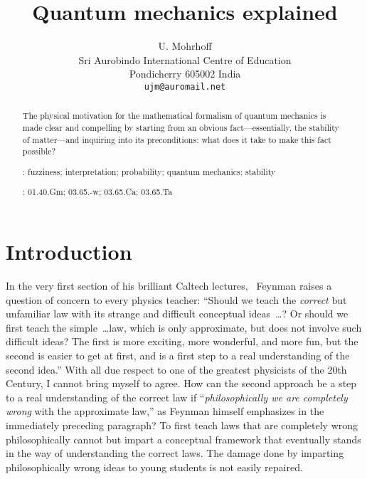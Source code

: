 \documentclass[12pt]{article}
\begin{document}
\setlength{\baselineskip}{16.5pt}
\title{Quantum mechanics explained}
\author{U. Mohrhoff\\
Sri Aurobindo International Centre of Education\\
Pondicherry 605002 India\\
\normalsize\tt ujm@auromail.net}
\date{}
\maketitle
\begin{abstract}
\noindent The physical motivation for the mathematical formalism of quantum mechanics is made clear and compelling by starting from an obvious fact---essentially, the stability of matter---and inquiring into its preconditions: what does it take to make this fact possible?

\vspace{6pt}: fuzziness; interpretation; probability; quantum mechanics; stability

\vspace{6pt}: 01.40.Gm; 03.65.-w; 03.65.Ca; 03.65.Ta
\setlength{\baselineskip}{14pt}
\end{abstract}
\pagebreak
\section{Introduction}
In the very first section of his brilliant Caltech lectures,~\cite{Feynmanteach} Feynman raises a question of concern to every physics teacher: ``Should we teach the {\it correct\/} but unfamiliar law with its strange and difficult conceptual ideas~\dots? Or should we first teach the simple~\dots law, which is only approximate, but does not involve such difficult ideas? The first is more exciting, more wonderful, and more fun, but the second is easier to get at first, and is a first step to a real understanding of the second idea.'' With all due respect to one of the greatest physicists of the 20th Century, I cannot bring myself to agree. How can the second approach be a step to a real understanding of the correct law if ``{\it philosophically we are completely wrong\/} with the approximate law,'' as Feynman himself emphasizes in the immediately preceding paragraph? To first teach laws that are completely wrong philosophically cannot but impart a conceptual framework that eventually stands in the way of understanding the correct laws. The damage done by imparting philosophically wrong ideas to young students is not easily repaired. 
\end{document}
